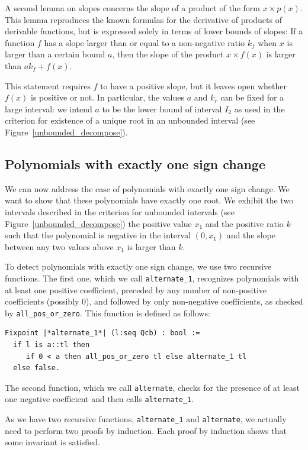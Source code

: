 \documentclass{mscs}
\begin{document}
A second lemma on slopes concerns the slope of a product of the form
\(x \times p(x)\).  This
lemma reproduces the known formulas for the derivative of products of derivable
functions, but is expressed solely in terms of lower bounds of slopes:
 If  a function \(f\) has a slope larger than or equal to a non-negative
ratio \(k_f\) when \(x\) is larger than a certain bound \(a\), 
then the slope of the product \(x \times f(x)\) is larger than
\(a k_f + f(x)\).

This statement requires \(f\) to have a positive slope, but it leaves open
whether \(f(x)\) is positive or not.  In particular, the values \(a\) and
\(k_r\) can be fixed for a large interval: we intend \(a\) to be the lower
bound of interval \(I_2\) as used in the criterion for existence of a unique
root in an unbounded interval (see Figure~\ref{unbounded_decompose}).

\subsection{Polynomials with exactly one sign change}
We can now address the case of polynomials with exactly one sign
change.  We want
to show that these polynomials have exactly one root.  We exhibit the
two intervals described in the criterion for unbounded intervals (see
Figure~\ref{unbounded_decompose}) the positive value \(x_1\) and the
positive ratio \(k\) such that the polynomial is negative in the
interval \((0, x_1)\) and the slope between any two values above
\(x_1\) is larger than \(k\).

To detect polynomials with exactly one sign change, we use two recursive
functions.  The first one, which we call {\tt alternate\_1}, recognizes
polynomials with at least one positive coefficient, preceded by any number
of non-positive coefficients (possibly 0), and followed by only non-negative
coefficients, as checked by {\tt all\_pos\_or\_zero}.  This function is
defined as follows:
\begin{lstlisting}
Fixpoint |*alternate_1*| (l:seq Qcb) : bool :=
  if l is a::tl then
     if 0 < a then all_pos_or_zero tl else alternate_1 tl
  else false.
\end{lstlisting}
The second function, which we call {\tt alternate}, checks for the
presence of at least one negative coefficient and then calls {\tt alternate\_1}.

As we have two recursive functions, {\tt alternate\_1} and {\tt alternate},
we actually need to perform two proofs by induction.  Each proof by induction
shows that some invariant is satisfied.
\end{document}
